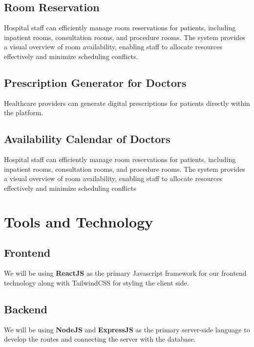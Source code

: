 \documentclass[11.5pt]{article}
\begin{document}
	
	\subsection{Room Reservation}
	
	 Hospital staff can efficiently manage room reservations for patients, including inpatient rooms, consultation rooms, and procedure rooms. The system provides a visual overview of room availability, enabling staff to allocate resources effectively and minimize scheduling conflicts.
	 
	\subsection{Prescription Generator for Doctors}
	 
	Healthcare providers can generate digital prescriptions for patients directly within the platform.
	 
	\subsection{Availability Calendar of Doctors}
	 
	Hospital staff can efficiently manage room reservations for patients, including inpatient rooms, consultation rooms, and procedure rooms. The system provides a visual overview of room availability, enabling staff to allocate resources effectively and minimize scheduling conflicts
	
	
	
	
	\section{Tools and Technology}
	
	\subsection{Frontend}
	We will be using \textbf{ReactJS} as the primary Javascript framework for our frontend technology along with TailwindCSS for styling the client side.
	
	\subsection{Backend}
	We will be using \textbf{NodeJS} and \textbf{ExpressJS} as the primary server-side language to develop the routes and connecting the server with the database.
	
\end{document}
